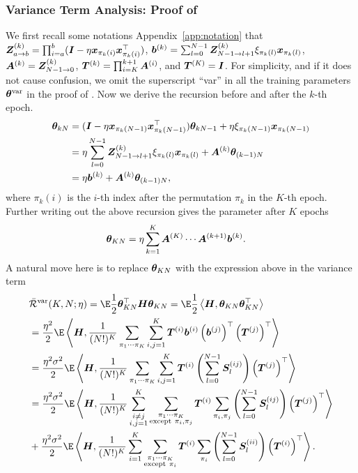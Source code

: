 \subsubsection{Variance Term Analysis: Proof of }\label{app:var-term-proof}
We first recall some notations Appendix~\ref{app:notation} that ${\bm{Z}}^{(k)}_{a \to b} = \prod_{i=a}^b({\bm{I}} - \eta {\bm{x}}_{\pi_k(i)}{\bm{x}}_{\pi_k(i)}^{\top})$, ${\bm{b}}^{(k)} = \sum_{l=0}^{N-1}{\bm{Z}}_{N-1 \to l+1}^{(k)}\xi_{\pi_k(l)}{\bm{x}}_{\pi_k(l)}$, ${\bm{A}}^{(k)} = {\bm{Z}}^{(k)}_{N-1 \to 0}$, $ {\bm{T}}^{(k)} = \prod_{i=K}^{k+1}{\bm{A}}^{(i)}$, and ${\bm{T}}^{(K)} = {\bm{I}}$. For simplicity, and if it does not cause confusion, we omit the superscript ``var'' in all the training parameters ${\bm{\theta}}^{\mathrm{var}}$ in the proof of . 
Now we derive the recursion before and after the $k$-th epoch.
\begin{align*}
    {\bm{\theta}}_{kN} &= ({\bm{I}}-\eta {\bm{x}}_{\pi_k(N-1)}{\bm{x}}_{\pi_k(N-1)}^{\top}){\bm{\theta}}_{kN-1}+\eta\xi_{\pi_k(N-1)}
    {\bm{x}}_{\pi_k(N-1)} \\
    &= \eta \sum_{l=0}^{N-1}{\bm{Z}}_{N-1 \to l+1}^{(k)}\xi_{\pi_k(l)}{\bm{x}}_{\pi_k(l)}+ {\bm{A}}^{(k)}{\bm{\theta}}_{(k-1)N} \\
    &=\eta {\bm{b}}^{(k)}+{\bm{A}}^{(k)}{\bm{\theta}}_{(k-1)N},
\end{align*}
where $\pi_k(i)$ is the $i$-th index after the permutation $\pi_k$ in the $K$-th epoch. Further writing out the above recursion gives the parameter after $K$ epochs
\begin{align*}     
    {\bm{\theta}}_{KN} &= \eta\sum_{k=1}^{K}{\bm{A}}^{(K)}\cdots{\bm{A}}^{(k+1)}{\bm{b}}^{(k)}.
\end{align*}
A natural move here is to replace ${\bm{\theta}}_{KN}$ with the expression above in the variance term
\begin{align}
    &\bar\cR^{\var}(K,N;\eta) = \E\frac{1}{2}\vtheta_{KN}^{\top}\mH\vtheta_{KN} = \E\frac{1}{2}\inp{\mH}{\vtheta_{KN}\vtheta_{KN}^{\top}} \notag\\
    &=\frac{\eta^2}{2}\E\inp{\mH}{\frac{1}{(N!)^K}\sum_{\pi_1\cdots \pi_K}\sum_{i,j=1}^K\mT^{(i)}\vb^{(i)}\left(\vb^{(j)}\right)^{\top}\left(\mT^{(j)}\right)^{\top}} \notag\\
    &=\frac{\eta^2\sigma^2}{2}\E\inp{\mH}{\frac{1}{(N!)^K}\sum_{\pi_1\cdots \pi_K}\sum_{i,j=1}^K\mT^{(i)}\left(\sum_{l=0}^{N-1}\mS_l^{(ij)}\right)\left(\mT^{(j)}\right)^{\top}}\notag\\
    &=\frac{\eta^2\sigma^2}{2}\E\inp{\mH}{\frac{1}{(N!)^K}\sum_{\substack{i\neq j \\i,j=1}}^K\sum_{\substack{\pi_1\cdots \pi_K \\ \text{except} ~\pi_i, \pi_j}}\mT^{(i)}\sum_{\pi_i, \pi_j}\left(\sum_{l=0}^{N-1}\mS_l^{(ij)}\right)\left(\mT^{(j)}\right)^{\top}} \notag \\
    &+\frac{\eta^2\sigma^2}{2}\E\inp{\mH}{\frac{1}{(N!)^K}\sum_{i=1}^K\sum_{\substack{\pi_1\cdots \pi_K \\ \text{except} ~\pi_i}}\mT^{(i)}\sum_{\pi_i}\left(\sum_{l=0}^{N-1}\mS_l^{(ii)}\right)\left(\mT^{(i)}\right)^{\top}}. \label{equ:var-term-decompose}
\end{align}
